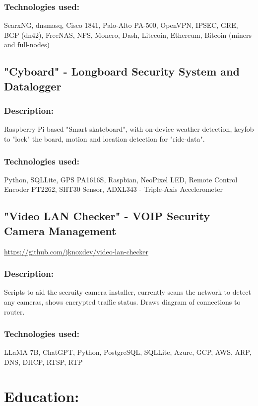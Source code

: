 \documentclass[letter,10pt]{article}
\begin{document}
\subsubsection*{Technologies used:}
\label{sec:org55ac399}
SearxNG, dnsmasq, Cisco 1841, Palo-Alto PA-500, OpenVPN, IPSEC, GRE, BGP (dn42), FreeNAS, NFS, Monero, Dash, Litecoin, Ethereum, Bitcoin (miners and full-nodes)

\subsection*{"Cyboard" - Longboard Security System and Datalogger}
\label{sec:org6930a51}
\subsubsection*{Description:}
\label{sec:orgc288bbe}
Raspberry Pi based "Smart skateboard", with on-device weather detection, keyfob to "lock" the board, motion and location detection for "ride-data".
\subsubsection*{Technologies used:}
\label{sec:org78101eb}
Python, SQLLite, GPS PA1616S, Raspbian, NeoPixel LED, Remote Control Encoder PT2262, SHT30 Sensor, ADXL343 - Triple-Axis Accelerometer

\subsection*{"Video LAN Checker" - VOIP Security Camera Management}
\label{sec:orgd061bba}
\url{https://github.com/jknoxdev/video-lan-checker}
\subsubsection*{Description:}
\label{sec:orgaa286a7}
Scripts to aid the secruity camera installer, currently scans the network to detect any cameras, shows encrypted traffic status. Draws diagram of connections to router.
\subsubsection*{Technologies used:}
\label{sec:orgb32c65b}
LLaMA 7B, ChatGPT, Python, PostgreSQL, SQLLite, Azure, GCP, AWS, ARP, DNS, DHCP, RTSP, RTP
\section*{Education:}
\label{sec:org3df7cac}
\end{document}
